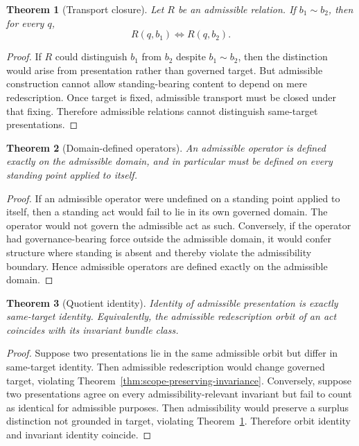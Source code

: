 \documentclass[11pt]{article}
\newtheorem{theorem}{Theorem}[section]
\theoremstyle{definition}
\theoremstyle{remark}
\begin{document}
\begin{theorem}[Transport closure]\label{thm:transport-closure}
Let $R$ be an admissible relation. If $b_1 \sim b_2$, then for every $q$,
\[
R(q,b_1) \Longleftrightarrow R(q,b_2).
\]
\end{theorem}

\begin{proof}
If $R$ could distinguish $b_1$ from $b_2$ despite $b_1 \sim b_2$, then the distinction would arise from presentation rather than governed target. But admissible construction cannot allow standing-bearing content to depend on mere redescription. Once target is fixed, admissible transport must be closed under that fixing. Therefore admissible relations cannot distinguish same-target presentations.
\end{proof}

\begin{theorem}[Domain-defined operators]
An admissible operator is defined exactly on the admissible domain, and in particular must be defined on every standing point applied to itself.
\end{theorem}

\begin{proof}
If an admissible operator were undefined on a standing point applied to itself, then a standing act would fail to lie in its own governed domain. The operator would not govern the admissible act as such. Conversely, if the operator had governance-bearing force outside the admissible domain, it would confer structure where standing is absent and thereby violate the admissibility boundary. Hence admissible operators are defined exactly on the admissible domain.
\end{proof}

\begin{theorem}[Quotient identity]
Identity of admissible presentation is exactly same-target identity. Equivalently, the admissible redescription orbit of an act coincides with its invariant bundle class.
\end{theorem}

\begin{proof}
Suppose two presentations lie in the same admissible orbit but differ in same-target identity. Then admissible redescription would change governed target, violating Theorem~\ref{thm:scope-preserving-invariance}. Conversely, suppose two presentations agree on every admissibility-relevant invariant but fail to count as identical for admissible purposes. Then admissibility would preserve a surplus distinction not grounded in target, violating Theorem~\ref{thm:transport-closure}. Therefore orbit identity and invariant identity coincide.
\end{proof}
\end{document}
